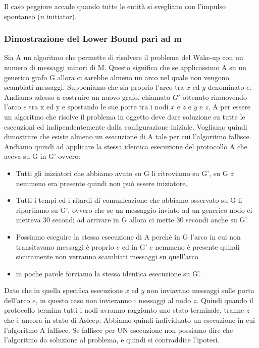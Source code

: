 Il caso peggiore accade quando tutte le entità si svegliano con l'impulso
spontaneo ($n$ initiator).

\subsubsection{Dimostrazione del Lower Bound pari ad m}
Sia A un algoritmo che permette di risolvere il problema del Wake-up con un
numero di messaggi minori di M. Questo significa che se applicassimo A su un
generico grafo G allora ci sarebbe almeno un arco nel quale non vengono
scambiati messaggi. Supponiamo che sia proprio l'arco tra $x$ ed $y$ denominato
$e$. Andiamo adesso a costruire un nuovo grafo, chiamato $G'$ ottenuto
rimuovendo l'arco $e$ tra x ed y e spostando le sue porte tra i nodi $x$ e $z$ e
$y$ e $z$. A per essere un algoritmo che risolve il problema in oggetto deve
dare soluzione su tutte le esecuzioni ed indipendentemente dalla configurazione
iniziale. Vogliamo quindi dimostrare che esiste almeno un esecuzione di A tale
per cui l'algoritmo fallisce. Andiamo quindi ad applicare la stessa identica
esecuzione del protocollo A che aveva su G in G' ovvero:
\begin{itemize}
    \item Tutti gli iniziatori che abbiamo avuto su G li ritroviamo su G', su G
          $z$ nemmeno era presente quindi non può essere iniziatore.
    \item Tutti i tempi ed i ritardi di comunicazione che abbiamo osservato su G
          li riportiamo su G', ovvero che se un messaggio inviato ad un generico nodo ci
          metteva 30 secondi ad arrivare in G allora ci mette 30 secondi anche su G'.
    \item Possiamo eseguire la stessa esecuzione di A perchè in G l'arco in cui
          non transitavano messaggi è proprio $e$ ed in G' $e$ nemmeno è presente quindi
          sicuramente non verranno scambiati messaggi su quell'arco
    \item in poche parole forziamo la stessa identica esecuzione su G'.
\end{itemize}
Dato che in quella specifica esecuzione $x$ ed $y$ non inviavano messaggi sulle
porta dell'arco $e$, in questo caso non invieranno i messaggi al nodo $z$.
Quindi quando il protocollo termina tutti i nodi avranno raggiunto uno stato
terminale, tranne $z$ che è ancora in stato di Asleep. Abbiamo quindi
individuato un esecuzione in cui l'algoritmo A fallisce. Se fallisce per UN
esecuzione non possiamo dire che l'algoritmo da soluzione al problema, e quindi
si contraddice l'ipotesi.\\

